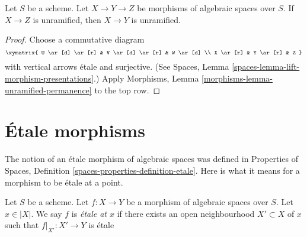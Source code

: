 \begin{lemma}
\label{lemma-permanence-unramified}
Let $S$ be a scheme.
Let $X \to Y \to Z$ be morphisms of algebraic spaces over $S$.
If $X \to Z$ is unramified, then $X \to Y$ is unramified.
\end{lemma}

\begin{proof}
Choose a commutative diagram
$$
\xymatrix{
U \ar[d] \ar[r] & V \ar[d] \ar[r] & W \ar[d] \\
X \ar[r] & Y \ar[r] & Z
}
$$
with vertical arrows \'etale and surjective. (See
Spaces, Lemma \ref{spaces-lemma-lift-morphism-presentations}.)
Apply
Morphisms, Lemma \ref{morphisms-lemma-unramified-permanence}
to the top row.
\end{proof}














\section{\'Etale morphisms}
\label{section-etale}

\noindent
The notion of an \'etale morphism of algebraic spaces was defined in
Properties of Spaces, Definition \ref{spaces-properties-definition-etale}.
Here is what it means for a morphism to be \'etale at a point.

\begin{definition}
\label{definition-etale}
Let $S$ be a scheme.
Let $f : X \to Y$ be a morphism of algebraic spaces over $S$.
Let $x \in |X|$. We say $f$ is {\it \'etale at $x$} if there
exists an open neighbourhood $X' \subset X$ of $x$ such that
$f|_{X'} : X' \to Y$ is \'etale
\end{definition}

